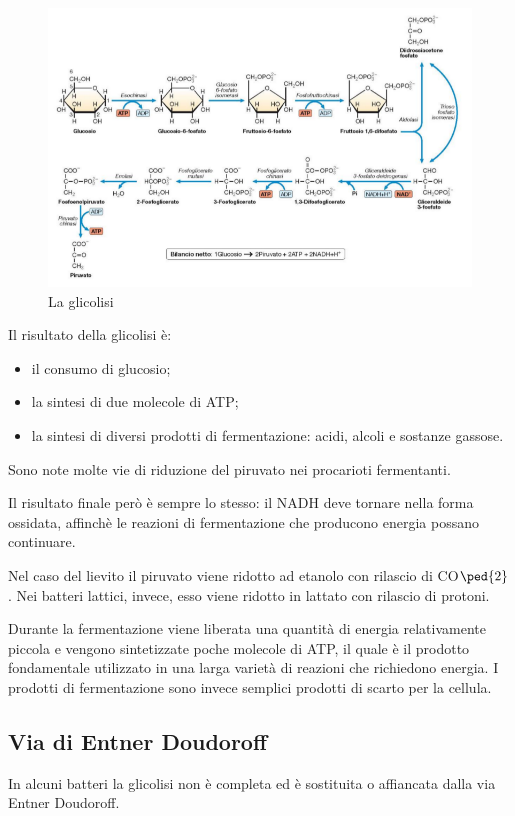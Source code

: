 \documentclass[11pt]{book}
\begin{document}
\clearpage
\begin{figure}[htp]
\centering
\includegraphics[scale=0.6]{img/Glicolisi.png}
\caption{La glicolisi}
\label{}
\end{figure}

Il risultato della glicolisi è:
\begin{itemize}
\item il consumo di glucosio;
\item la sintesi di due molecole di ATP;
\item la sintesi di diversi prodotti di fermentazione: acidi, alcoli e sostanze gassose.
\end{itemize}

Sono note molte vie di riduzione del piruvato nei procarioti fermentanti. 

Il risultato finale però è sempre lo stesso: il NADH deve tornare nella forma ossidata, affinchè le reazioni di fermentazione che producono energia possano continuare.

Nel caso del lievito il piruvato viene ridotto ad etanolo con rilascio di CO$\ped{2}$. Nei batteri lattici, invece, esso viene ridotto in lattato con rilascio di protoni.

Durante la fermentazione viene liberata una quantità di energia relativamente piccola e vengono sintetizzate poche molecole di ATP, il quale è il prodotto fondamentale utilizzato in una larga varietà di reazioni che richiedono energia.
I prodotti di fermentazione sono invece semplici prodotti di scarto per la cellula.

\subsection{Via di Entner Doudoroff }
In alcuni batteri la glicolisi non è completa ed è sostituita o affiancata dalla via Entner Doudoroff.
\end{document}
